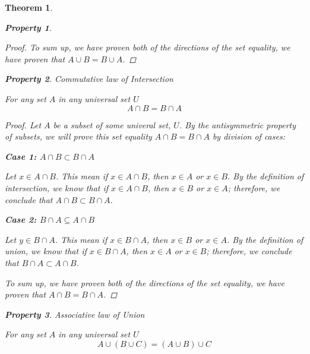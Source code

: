 \documentclass{book}
\newtheorem{theorem}{Theorem}[section]
\newtheorem{property}{Property}[theorem]
\theoremstyle{definition}
\theoremstyle{remark}
\begin{document}
\begin{theorem}
\begin{property}
\begin{proof}
            To sum up, we have proven both of the directions of the set equality, we have proven that $A \cup B = B \cup A$. 
        \end{proof}
    \end{property}
    
    
    \begin{property}
    Commutative law of Intersection \\
        \begin{tcolorbox}
            For any set $A$ in any universal set $U$
                \begin{equation*}
                    A \cap B = B \cap A
                \end{equation*}
        \end{tcolorbox}
    
        \begin{proof}
            Let $A$ be a subset of some univeral set, $U$. By the antisymmetric property of subsets, we will prove this set equality $A \cap B = B \cap A$ by division of cases:
            
            \begin{flushleft} \textbf{Case 1: $A \cap B \subset B \cap A$} \end{flushleft}
                Let $x \in A \cap B$. This mean if $x \in A \cap B$, then $x \in A$ or $x \in B$. By the definition of intersection, we know that if $x \in A \cap B$, then $x \in B$ or $x \in A$; therefore, we conclude that $A \cap B \subset B \cap A$.
            
            \begin{flushleft} \textbf{Case 2: $B \cap A \subseteq A \cap B$} \end{flushleft} 
                Let $y \in B \cap A$. This mean if $x \in B \cap A$, then $x \in B$ or $x \in A$. By the definition of union, we know that if $x \in B \cap A$, then $x \in A$ or $x \in B$; therefore, we conclude that $B \cap A \subset A \cap B$.
            
            To sum up, we have proven both of the directions of the set equality, we have proven that $A \cap B = B \cap A$. 
        \end{proof}
    \end{property}
     
    
    \newpage
    \begin{property}
    Associative law of Union \\
        \begin{tcolorbox}
            For any set $A$ in any universal set $U$
                \begin{equation*}
                    A \cup (B \cup C) = (A \cup B) \cup C
                \end{equation*}
        \end{tcolorbox}
    

\end{property}
\end{theorem}
\end{document}
